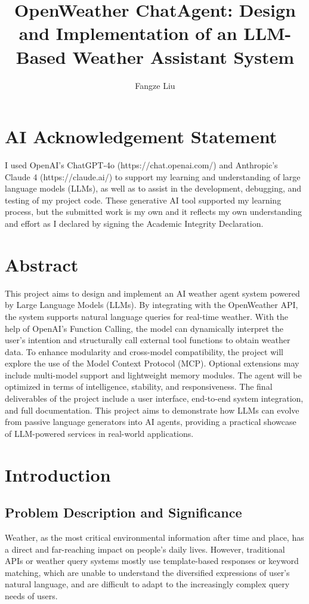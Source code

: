 \documentclass[final-report]{report-template}
\title{OpenWeather ChatAgent: Design and Implementation of an LLM-Based Weather Assistant System}
\author{Fangze Liu}
\begin{document}
\maketitlepage  %

\tableofcontents
\newpage   %

\section*{AI Acknowledgement Statement}
I used OpenAI’s ChatGPT‑4o (https://chat.openai.com/) and Anthropic’s Claude 4 (https://claude.ai/) to support my learning and understanding of large language models (LLMs), as well as to assist in the development, debugging, and testing of my project code. These generative AI tool supported my learning process, but the submitted work is my own and it reflects my own understanding and effort as I declared by signing the Academic Integrity Declaration.

\section*{Abstract}
This project aims to design and implement an AI weather agent system powered by Large Language Models (LLMs). By integrating with the OpenWeather API, the system supports natural language queries for real-time weather. With the help of OpenAI's Function Calling, the model can dynamically interpret the user's intention and structurally call external tool functions to obtain weather data. To enhance modularity and cross-model compatibility, the project will explore the use of the Model Context Protocol (MCP). Optional extensions may include multi-model support and lightweight memory modules. The agent will be optimized in terms of intelligence, stability, and responsiveness. The final deliverables of the project include a user interface, end-to-end system integration, and full documentation. This project aims to demonstrate how LLMs can evolve from passive language generators into AI agents, providing a practical showcase of LLM-powered services in real-world applications.

\newpage
\section{Introduction}
\subsection{Problem Description and Significance}
Weather, as the most critical environmental information after time and place, has a direct and far-reaching impact on people's daily lives. However, traditional APIs or weather query systems mostly use template-based responses or keyword matching, which are unable to understand the diversified expressions of user's natural language, and are difficult to adapt to the increasingly complex query needs of users. 
\end{document}
